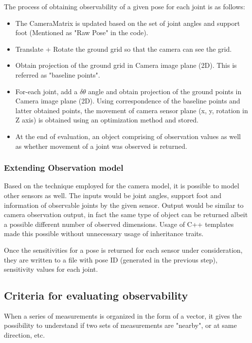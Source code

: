 \documentclass[english, printversion, nomenclature, notitle]{tuvisionthesis} %
\begin{document}
The process of obtaining observability of a given pose for each joint is as follows: 
\begin{itemize}
	\item The CameraMatrix is updated based on the set of joint angles and support foot (Mentioned as "Raw Pose" in the code).
	\item Translate + Rotate the ground grid so that the camera can see the grid.
	\item Obtain projection of the ground grid in Camera image plane (2D). This is referred as "baseline points".
	\item For-each joint, add a \(\delta\theta\) angle and obtain projection of the ground points in Camera image plane (2D).
	\subitem Using correspondence of the baseline points and latter obtained points, the movement of camera sensor plane (x, y, rotation in Z axis) is obtained using an optimization method and stored.
	\item At the end of evaluation, an object comprising of observation values as well as whether movement of a joint was observed is returned.
\end{itemize}


\subsubsection{Extending Observation model}

Based on the technique employed for the camera model, it is possible to model other sensors as well. The inputs would be joint angles, support foot and information of observable joints by the given sensor.
Output would be similar to camera observation output, in fact the same type of object can be returned albeit a possible different number of observed dimensions. Usage of C++ templates made this possible without unnecessary usage of inheritance traits. 

Once the sensitivities for a pose is returned for each sensor under consideration, they are written to a file with pose ID (generated in the previous step), sensitivity values for each joint. 
\subsection{Criteria for evaluating observability}

When a series of measurements is organized in the form of a vector, it gives the possibility to understand if two sets of measurements are "nearby", or at same direction, etc. 
\end{document}
